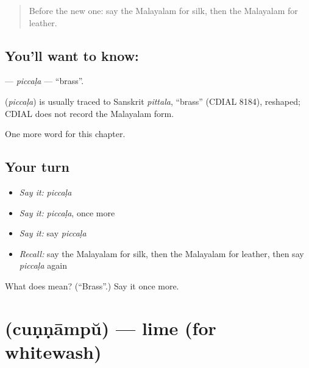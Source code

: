 \label{lesson:ML-C217-piccala}



\begin{quote}
Before the new one: say the Malayalam for silk, then the Malayalam for leather.
\end{quote}

\subsection*{You'll want to know: }
\textbf{} — \emph{piccaḷa} — \textquotedblleft{}brass\textquotedblright{}.

\begin{cousinweb}
\textbf{} (\emph{piccaḷa}) is usually traced to Sanskrit \emph{pittala}, \textquotedblleft{}brass\textquotedblright{} (CDIAL 8184), reshaped; CDIAL does not record the Malayalam form.
\end{cousinweb}

\begin{grammarlens}[title={What you've built}]
One more word for this chapter.
\end{grammarlens}

\subsection*{Your turn}
\begin{itemize}
\raggedright
  \item \emph{Say it:} \emph{piccaḷa}
  \item \emph{Say it:} \emph{piccaḷa}, once more
  \item \emph{Say it:} say \emph{piccaḷa}
  \item \emph{Recall:} say the Malayalam for silk, then the Malayalam for leather, then say \emph{piccaḷa} again
\end{itemize}

\begin{tcolorbox}[breakable,colback=teal!4,colframe=teal!35!black,title={Before you move on}]
What does  mean? (\textquotedblleft{}Brass\textquotedblright{}.) Say it once more.
\end{tcolorbox}
\section[\texorpdfstring{\ml{ചുണ്ണാമ്പ്} (cuṇṇāmpŭ)}{ചുണ്ണാമ്പ് (cuṇṇāmpŭ)}]{ (cuṇṇāmpŭ) — lime (for whitewash)}


